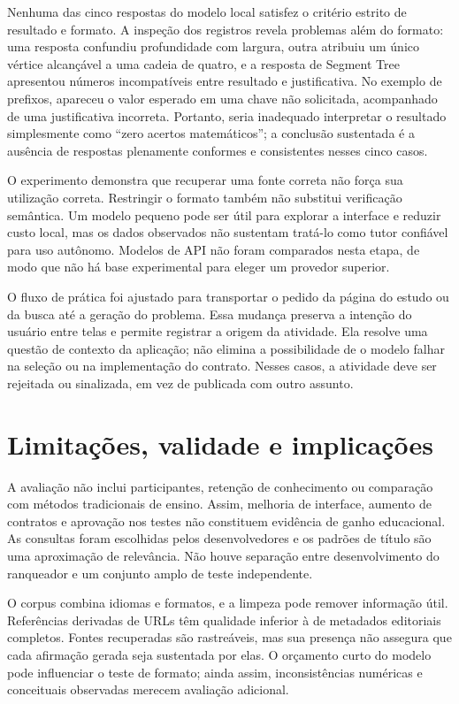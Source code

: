 \documentclass[12pt]{article}
\begin{document}
Nenhuma das cinco respostas do modelo local satisfez o critério estrito de resultado e formato. A inspeção dos registros revela problemas além do formato: uma resposta confundiu profundidade com largura, outra atribuiu um único vértice alcançável a uma cadeia de quatro, e a resposta de Segment Tree apresentou números incompatíveis entre resultado e justificativa. No exemplo de prefixos, apareceu o valor esperado em uma chave não solicitada, acompanhado de uma justificativa incorreta. Portanto, seria inadequado interpretar o resultado simplesmente como ``zero acertos matemáticos''; a conclusão sustentada é a ausência de respostas plenamente conformes e consistentes nesses cinco casos.

O experimento demonstra que recuperar uma fonte correta não força sua utilização correta. Restringir o formato também não substitui verificação semântica. Um modelo pequeno pode ser útil para explorar a interface e reduzir custo local, mas os dados observados não sustentam tratá-lo como tutor confiável para uso autônomo. Modelos de API não foram comparados nesta etapa, de modo que não há base experimental para eleger um provedor superior.

O fluxo de prática foi ajustado para transportar o pedido da página do estudo ou da busca até a geração do problema. Essa mudança preserva a intenção do usuário entre telas e permite registrar a origem da atividade. Ela resolve uma questão de contexto da aplicação; não elimina a possibilidade de o modelo falhar na seleção ou na implementação do contrato. Nesses casos, a atividade deve ser rejeitada ou sinalizada, em vez de publicada com outro assunto.

\section{Limitações, validade e implicações}
A avaliação não inclui participantes, retenção de conhecimento ou comparação com métodos tradicionais de ensino. Assim, melhoria de interface, aumento de contratos e aprovação nos testes não constituem evidência de ganho educacional. As consultas foram escolhidas pelos desenvolvedores e os padrões de título são uma aproximação de relevância. Não houve separação entre desenvolvimento do ranqueador e um conjunto amplo de teste independente.

O corpus combina idiomas e formatos, e a limpeza pode remover informação útil. Referências derivadas de URLs têm qualidade inferior à de metadados editoriais completos. Fontes recuperadas são rastreáveis, mas sua presença não assegura que cada afirmação gerada seja sustentada por elas. O orçamento curto do modelo pode influenciar o teste de formato; ainda assim, inconsistências numéricas e conceituais observadas merecem avaliação adicional.
\end{document}
